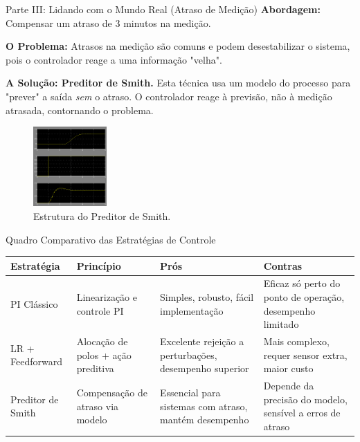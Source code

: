 \documentclass{beamer}
\begin{document}
\begin{frame}{Parte III: Lidando com o Mundo Real (Atraso de Medição)}
    \large \textbf{Abordagem:} Compensar um atraso de 3 minutos na medição.
    \vspace{0.5em}
    
    \small
    \textbf{O Problema:} Atrasos na medição são comuns e podem desestabilizar o sistema, pois o controlador reage a uma informação "velha".
    
    \vspace{0.5em}
    
    \textbf{A Solução: Preditor de Smith.} Esta técnica usa um modelo do processo para "prever" a saída \textit{sem} o atraso. O controlador reage à previsão, não à medição atrasada, contornando o problema.
    
    \begin{figure}
        \centering
        \includegraphics[width=0.25\textwidth]{Imagens/q13.png}
        \caption{\tiny Estrutura do Preditor de Smith.}
    \end{figure}
    
\end{frame}

\begin{frame}{Quadro Comparativo das Estratégias de Controle}
    \centering
    \tiny
    \renewcommand{\arraystretch}{1.1}
    \begin{tabularx}{\textwidth}{|X|X|X|X|}
        \hline
        \textbf{Estratégia} & \textbf{Princípio} & \textbf{Prós} & \textbf{Contras} \\
        \hline
        PI Clássico & Linearização e controle PI & Simples, robusto, fácil implementação & Eficaz só perto do ponto de operação, desempenho limitado \\
        \hline
        LR + Feedforward & Alocação de polos + ação preditiva & Excelente rejeição a perturbações, desempenho superior & Mais complexo, requer sensor extra, maior custo \\
        \hline
        Preditor de Smith & Compensação de atraso via modelo & Essencial para sistemas com atraso, mantém desempenho & Depende da precisão do modelo, sensível a erros de atraso \\
        \hline
    \end{tabularx}
\end{frame}
\end{document}
